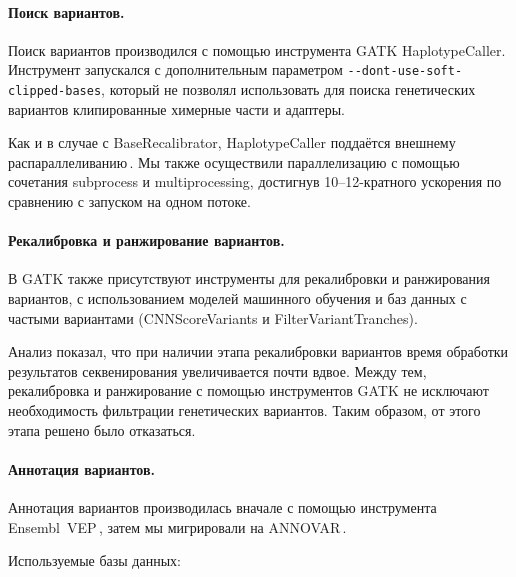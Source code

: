 \documentclass[a4paper,14pt]{extarticle}
\newcommand{\utilname}[1]{\textenglish{#1}}
\newcommand{\ecitep}[1]{\textenglish{\citep{#1}}}
\begin{document}
\paragraph{Поиск вариантов.}
Поиск вариантов производился с помощью инструмента \utilname{GATK HaplotypeCaller}.
Инструмент запускался с дополнительным параметром \verb|--dont-use-soft-clipped-bases|, который не позволял использовать для поиска генетических вариантов клипированные химерные части и адаптеры.

Как и в случае с \utilname{BaseRecalibrator}, \utilname{HaplotypeCaller} поддаётся внешнему распараллеливанию\,\ecitep{Heldenbrand_2019}.
Мы также осуществили параллелизацию с помощью сочетания \utilname{subprocess} и \utilname{multiprocessing}, достигнув 10--12-кратного ускорения по сравнению с запуском на одном потоке.

\paragraph{Рекалибровка и ранжирование вариантов.}
В GATK также присутствуют инструменты для рекалибровки и ранжирования вариантов, с использованием моделей машинного обучения и баз данных с частыми вариантами (\utilname{CNNScoreVariants} и \utilname{FilterVariantTranches}).

Анализ показал, что при наличии этапа рекалибровки вариантов время обработки результатов секвенирования увеличивается почти вдвое.
Между тем, рекалибровка и ранжирование с помощью инструментов GATK не исключают необходимость фильтрации генетических вариантов.
Таким образом, от этого этапа решено было отказаться.

\paragraph{Аннотация вариантов.}
Аннотация вариантов производилась вначале с помощью инструмента \utilname{Ensembl~VEP}\,\ecitep{McLaren_2016}, затем мы мигрировали на \utilname{ANNOVAR}\,\ecitep{Wang_2010}.

Используемые базы данных:
\end{document}

